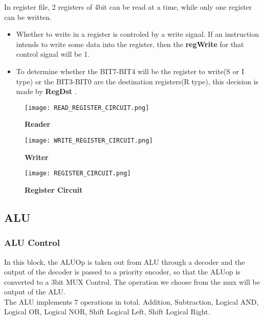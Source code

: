 \documentclass[12pt]{article}
\begin{document}
    In register file, 2 registers of 4bit can be read at a time, while only one register can be written. 
    \begin{itemize}
            \item Whether to write in a register is controled by a write signal. If an instruction intends to write some data into the register, then the \textbf{regWrite} for that control signal will be 1.
            \item To determine whether the BIT7-BIT4 will be the register to write(S or I type) or the BIT3-BIT0 are the destination registers(R type), this decision is made by \textbf{RegDst} .
    \end{itemize}

     \begin{figure}[H]
        \centering
        \texttt{[image: READ\_REGISTER\_CIRCUIT.png]}
        \caption{\textbf{Reader}}
        \label{fig:7}
    \end{figure}

    \begin{figure}[H]
        \centering
        \texttt{[image: WRITE\_REGISTER\_CIRCUIT.png]}
        \caption{\textbf{Writer}}
        \label{fig:8}
    \end{figure}

    \begin{figure}[H]
        \centering
        \texttt{[image: REGISTER\_CIRCUIT.png]}
        \caption{\textbf{Register Circuit}}
        \label{fig:9}
    \end{figure}
\subsection{ALU}
\subsubsection{ALU Control}
    In this block, the ALUOp is taken out from ALU through a decoder and the output of the decoder is passed to a priority encoder, so that the ALUop is converted to a 3bit MUX Control. The operation we choose from the mux will be output of the ALU.\\

    The ALU implements 7 operations in total. Addition, Subtraction, Logical AND, Logical OR, Logical NOR, Shift Logical Left, Shift Logical Right.
\end{document}
